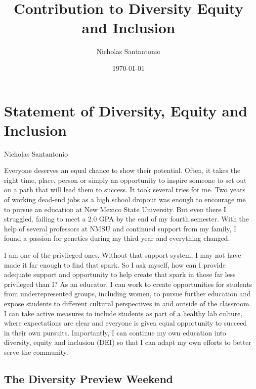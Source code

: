 \documentclass[11pt]{article}
\title{Contribution to Diversity Equity and Inclusion}
\author{Nicholas Santantonio}
\date{\today}
\begin{document}
\section*{\centering Statement of Diversity, Equity and Inclusion}
\begin{center} Nicholas Santantonio \end{center}

\noindent {}

\medskip

Everyone deserves an equal chance to show their potential. Often, it takes the right time, place, person or simply an opportunity to inspire someone to set out on a path that will lead them to success. It took several tries for me. Two years of working dead-end jobs as a high school dropout was enough to encourage me to pursue an education at New Mexico State University. But even there I struggled, failing to meet a 2.0 GPA by the end of my fourth semester. With the help of several professors at NMSU and continued support from my family, I found a passion for genetics during my third year and everything changed.

I am one of the privileged ones. Without that support system, I may not have made it far enough to find that spark. So I ask myself, how can I provide adequate support and opportunity to help create that spark in those far less privileged than I? As an educator, I can work to create opportunities for students from underrepresented groups, including women, to pursue further education and expose students to different cultural perspectives in and outside of the classroom. I can take active measures to include students as part of a healthy lab culture, where expectations are clear and everyone is given equal opportunity to succeed in their own pursuits. Importantly, I can continue my own education into diversity, equity and inclusion (DEI) so that I can adapt my own efforts to better serve the community. 

\subsection*{The Diversity Preview Weekend}
\end{document}
